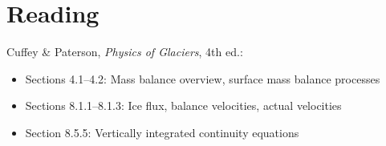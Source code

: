 \documentclass[11pt]{article}
\begin{document}

\section*{Reading}

Cuffey \& Paterson, \textit{Physics of Glaciers}, 4th ed.:
\begin{itemize}
  \item Sections 4.1--4.2: Mass balance overview, surface mass balance processes
  \item Sections 8.1.1--8.1.3: Ice flux, balance velocities, actual velocities
  \item Section 8.5.5: Vertically integrated continuity equations
\end{itemize}



\end{document}

